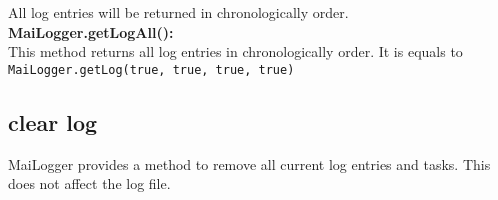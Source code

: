 \documentclass{article}
\begin{document}
    All log entries will be returned in chronologically order. \\

    \textbf{MaiLogger.getLogAll():} \\
    This method returns all log entries in chronologically order.
    It is equals to \lstinline|MaiLogger.getLog(true, true, true, true)|

    \subsection{clear log}
    MaiLogger provides a method to remove all current log entries and tasks.
    This does not affect the log file.
\end{document}
